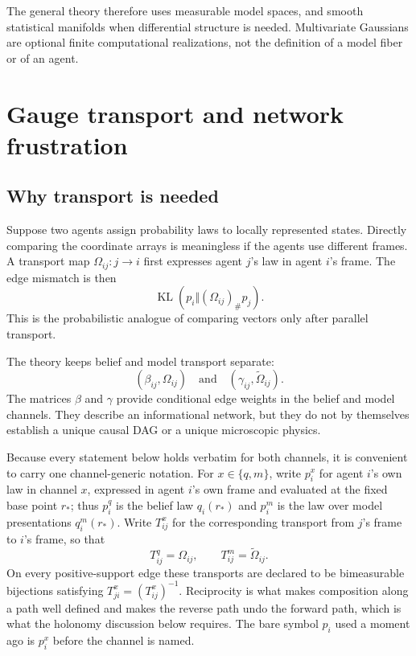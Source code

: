 \documentclass[11pt,letterpaper]{article}
\newcommand{\KL}{\operatorname{KL}}
\begin{document}
The general theory therefore uses measurable model spaces, and smooth statistical manifolds when differential structure is needed. Multivariate Gaussians are optional finite computational realizations, not the definition of a model fiber or of an agent.

\section{Gauge transport and network frustration}

\subsection{Why transport is needed}
\label{sec:transport}

Suppose two agents assign probability laws to locally represented states. Directly comparing the coordinate arrays is meaningless if the agents use different frames. A transport map \(\Omega_{ij}:j\to i\) first expresses agent \(j\)'s law in agent \(i\)'s frame. The edge mismatch is then
\[
  \KL\left(p_i\Vert(\Omega_{ij})_{\#}p_j\right).
\]
This is the probabilistic analogue of comparing vectors only after parallel transport.

The theory keeps belief and model transport separate:
\[
  (\beta_{ij},\Omega_{ij})
  \quad\text{and}\quad
  (\gamma_{ij},\widetilde\Omega_{ij}).
\]
The matrices \(\beta\) and \(\gamma\) provide conditional edge weights in the belief and model channels. They describe an informational network, but they do not by themselves establish a unique causal DAG or a unique microscopic physics.

Because every statement below holds verbatim for both channels, it is convenient to carry one channel-generic notation. For \(x\in\{q,m\}\), write \(p_i^x\) for agent \(i\)'s own law in channel \(x\), expressed in agent \(i\)'s own frame and evaluated at the fixed base point \(r_*\); thus \(p_i^q\) is the belief law \(q_i(r_*)\) and \(p_i^m\) is the law over model presentations \(q_i^{m}(r_*)\). Write \(T_{ij}^x\) for the corresponding transport from \(j\)'s frame to \(i\)'s frame, so that
\[
  T_{ij}^q=\Omega_{ij},
  \qquad
  T_{ij}^m=\widetilde\Omega_{ij}.
\]
On every positive-support edge these transports are declared to be bimeasurable bijections satisfying \(T_{ji}^x=(T_{ij}^x)^{-1}\). Reciprocity is what makes composition along a path well defined and makes the reverse path undo the forward path, which is what the holonomy discussion below requires. The bare symbol \(p_i\) used a moment ago is \(p_i^x\) before the channel is named.
\end{document}

